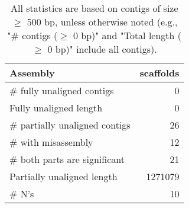 \documentclass[12pt,a4paper]{article}
\begin{document}
\begin{table}[ht]
\begin{center}
\caption{All statistics are based on contigs of size $\geq$ 500 bp, unless otherwise noted (e.g., "\# contigs ($\geq$ 0 bp)" and "Total length ($\geq$ 0 bp)" include all contigs).}
\begin{tabular}{|l*{1}{|r}|}
\hline
Assembly & scaffolds \\ \hline
\# fully unaligned contigs & 0 \\ \hline
Fully unaligned length & 0 \\ \hline
\# partially unaligned contigs & 26 \\ \hline
\hspace{5mm}\# with misassembly & 12 \\ \hline
\hspace{5mm}\# both parts are significant & 21 \\ \hline
Partially unaligned length & 1271079 \\ \hline
\# N's & 10 \\ \hline
\end{tabular}
\end{center}
\end{table}
\end{document}

